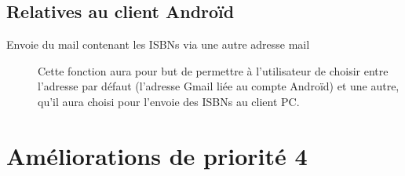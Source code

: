 \subsection{Relatives au client Androïd}
\begin{description}
 
\item[Envoie du mail contenant les ISBNs via une autre adresse mail]
	Cette fonction aura pour but de permettre à l'utilisateur de choisir entre l'adresse par défaut (l'adresse Gmail liée au compte Androïd) et une autre,
	qu'il aura choisi pour l'envoie des ISBNs au client PC. 

\end{description}

\section{Améliorations de priorité 4}
